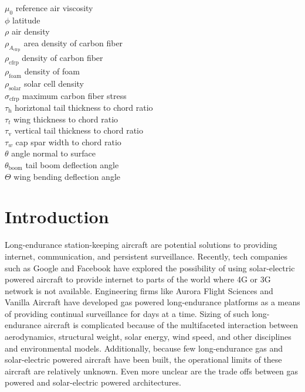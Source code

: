 \begin{multicols}{2}
\begin{tabbing}
$\mu_0$ \> reference air viscosity \\ %
$\phi$ \> latitude \\
$\rho$ \> air density \\ %
$\rho_{A_{\text{cfrp}}}$ \> area density of carbon fiber \\ %
$\rho_{\text{cfrp}}$ \> density of carbon fiber \\ %
$\rho_{\text{foam}}$ \> density of foam \\ %
$\rho_{\text{solar}}$ \> solar cell density \\ %
$\sigma_{\text{cfrp}}$ \> maximum carbon fiber stress \\ %
$\tau_{\text{h}}$ \> horiztonal tail thickness to chord ratio \\
$\tau_t$ \> wing thickness to chord ratio \\
$\tau_{\text{v}}$ \> vertical tail thickness to chord ratio \\
$\tau_w$ \> cap spar width to chord ratio \\
$\theta$ \> angle normal to surface \\
$\theta_{\text{boom}}$ \> tail boom deflection angle \\
$\Theta$ \> wing bending deflection angle 
 \end{tabbing}

\end{multicols}

\section{Introduction}

Long-endurance station-keeping aircraft are potential solutions to providing internet, communication, and persistent surveillance. 
Recently, tech companies such as Google\cite{googletitan} and Facebook\cite{aquila} have explored the possibility of using solar-electric powered aircraft to provide internet to parts of the world where 4G or 3G network is not available. 
Engineering firms like Aurora Flight Sciences\cite{orion} and Vanilla Aircraft\cite{vanilla} have developed gas powered long-endurance platforms as a means of providing continual surveillance for days at a time.  
Sizing of such long-endurance aircraft is complicated because of the multifaceted interaction between aerodynamics, structural weight, solar energy, wind speed, and other disciplines and environmental models.
Additionally, because few long-endurance gas and solar-electric powered aircraft have been built, the operational limits of these aircraft are relatively unknown. 
Even more unclear are the trade offs between gas powered and solar-electric powered architectures. 

